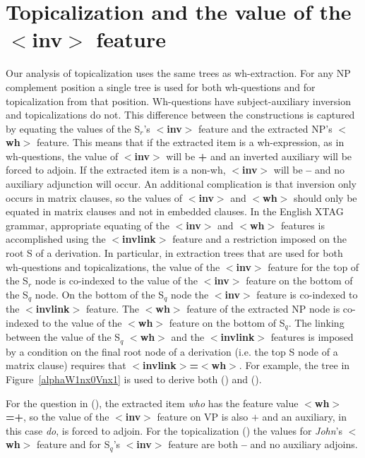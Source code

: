 \section{Topicalization and the value of the {\bf $<$inv$>$} feature}
\label{topicalization}

Our analysis of topicalization uses the same trees as wh-extraction.  For any
NP complement position a single tree is used for both wh-questions and for
topicalization from that position. Wh-questions have subject-auxiliary
inversion and topicalizations do not.  This difference between the
constructions is captured by equating the values of the S$_{r}$'s {\bf
$<$inv$>$} feature and the extracted NP's {\bf $<$wh$>$} feature.  This means
that if the extracted item is a wh-expression, as in wh-questions, the value of
{\bf $<$inv$>$} will be {\bf +} and an inverted auxiliary will be forced to
adjoin. If the extracted item is a non-wh, {\bf $<$inv$>$} will be {\bf --}
and no auxiliary adjunction will occur. An additional complication is that
inversion only occurs in matrix clauses, so the values of {\bf $<$inv$>$} and
{\bf $<$wh$>$} should only be equated in matrix clauses and not in embedded
clauses.  In the English XTAG grammar, appropriate equating of the {\bf
$<$inv$>$} and {\bf $<$wh$>$} features is accomplished using the {\bf
$<$invlink$>$} feature and a restriction imposed on the root S of a
derivation. In particular, in extraction trees that are used for both
wh-questions and topicalizations, the value of the {\bf $<$inv$>$} feature for
the top of the S$_{r}$ node is co-indexed to the value of the {\bf $<$inv$>$}
feature on the bottom of the S$_{q}$ node.  On the bottom of the S$_{q}$ node
the {\bf $<$inv$>$} feature is co-indexed to the {\bf $<$invlink$>$} feature.
The {\bf $<$wh$>$} feature of the extracted NP node is co-indexed to the value
of the {\bf $<$wh$>$} feature on the bottom of S$_{q}$. The linking between the
value of the S$_{q}$ {\bf $<$wh$>$} and the {\bf $<$invlink$>$} features is
imposed by a condition on the final root node of a derivation (i.e. the top S
node of a matrix clause) requires that {\bf $<$invlink$>$=$<$wh$>$}.  For
example, the tree in Figure~\ref{alphaW1nx0Vnx1} is used to
derive both () and ().



For the question in (), the extracted item {\it who} has the feature
value {\bf $<$wh$>$=+}, so the value of the {\bf $<$inv$>$} feature on VP is
also $+$ and an auxiliary, in this case {\it do}, is forced to adjoin.  For the
topicalization () the values for {\it John}'s {\bf $<$wh$>$} feature and
for S$_{q}$'s {\bf $<$inv$>$} feature are both {\bf --} and no auxiliary
adjoins.



